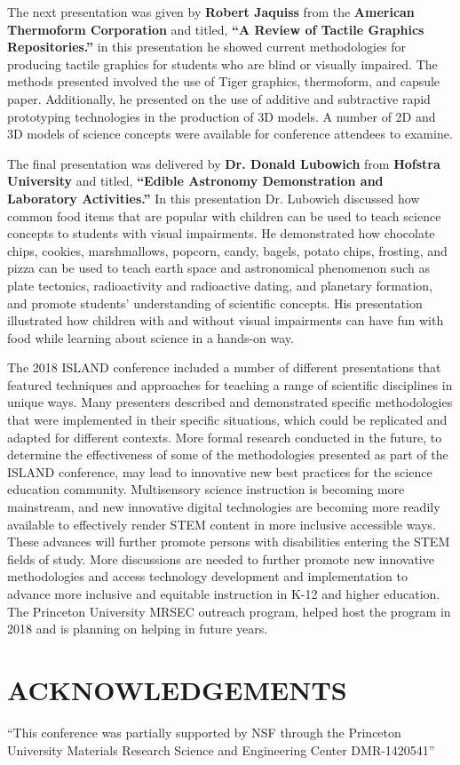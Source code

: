 \documentclass[11.5pt]{sig-alternate} %
\begin{document}
\begin{large}
The next presentation was given by \textbf{Robert Jaquiss} from the \textbf{American Thermoform Corporation} and titled, \textbf{“A Review of Tactile Graphics Repositories.”} in this presentation he showed current methodologies for producing tactile graphics for students who are blind or visually impaired. The methods presented involved the use of Tiger graphics, thermoform, and capsule paper. Additionally, he presented on the use of additive and subtractive rapid prototyping technologies in the production of 3D models. A number of 2D and 3D models of science concepts were available for conference attendees to examine.

The final presentation was delivered by \textbf{Dr. Donald Lubowich} from \textbf{Hofstra University} and titled, \textbf{“Edible Astronomy Demonstration and Laboratory Activities.”} In this presentation Dr. Lubowich discussed how common food items that are popular with children can be used to teach science concepts to students with visual impairments. He demonstrated how chocolate chips, cookies, marshmallows, popcorn, candy, bagels, potato chips, frosting, and pizza can be used to teach earth space and astronomical phenomenon such as plate tectonics, radioactivity and radioactive dating, and planetary formation, and promote students’ understanding of scientific concepts.  His presentation illustrated how children with and without visual impairments can have fun with food while learning about science in a hands-on way.

The 2018 ISLAND conference included a number of different presentations that featured techniques and approaches for teaching a range of scientific disciplines in unique ways. Many presenters described and demonstrated specific methodologies that were implemented in their specific situations, which could be replicated and adapted for different contexts.  More formal research conducted in the future, to determine the effectiveness of some of the methodologies presented as part of the ISLAND conference, may lead to innovative new best practices for the science education community. Multisensory science instruction is becoming more mainstream, and new innovative digital technologies are becoming more readily available to effectively render STEM content in more inclusive accessible ways. These advances will further promote persons with disabilities entering the STEM fields of study. More discussions are needed to further promote new innovative methodologies and access technology development and implementation to advance more inclusive and equitable instruction in K-12 and higher education.  The Princeton University MRSEC outreach program, helped host the program in 2018 and is planning on helping in future years.

\section*{ACKNOWLEDGEMENTS}
“This conference was partially supported by NSF through the Princeton University Materials Research Science and Engineering Center DMR-1420541”

\end{large}
\end{document}
